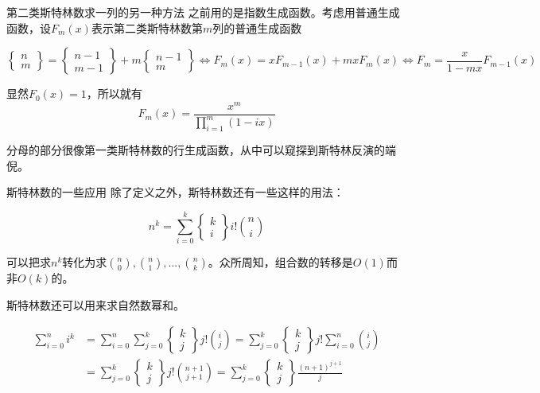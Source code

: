 \documentclass{beamer}
\begin{document}
	\begin{frame}{第二类斯特林数求一列的另一种方法}
		之前用的是指数生成函数。考虑用普通生成函数，设$F_m(x)$表示第二类斯特林数第$m$列的普通生成函数
		
		$$\begin{Bmatrix}n\\m\end{Bmatrix}=\begin{Bmatrix}n-1\\m-1\end{Bmatrix}+m\begin{Bmatrix}n-1\\m\end{Bmatrix} \Leftrightarrow F_m(x)=xF_{m-1}(x)+mxF_m(x)\Leftrightarrow F_m=\frac{x}{1-mx}F_{m-1}(x)$$
		
		显然$F_0(x)=1$，所以就有$$F_m(x)=\frac{x^m}{\prod_{i=1}^m(1-ix)}$$
		
		分母的部分很像第一类斯特林数的行生成函数，从中可以窥探到斯特林反演的端倪。
	\end{frame}
	\begin{frame}{斯特林数的一些应用}
		除了定义之外，斯特林数还有一些这样的用法：
		
		$$n^k=\sum_{i=0}^k\begin{Bmatrix}k\\i\end{Bmatrix}i!\binom{n}{i}$$
		
		可以把求$n^k$转化为求$\binom{n}{0},\binom{n}{1},...,\binom{n}{k}$。众所周知，组合数的转移是$O(1)$而非$O(k)$的。
		
		斯特林数还可以用来求自然数幂和。
		
		$$
		\begin{aligned}
		\sum_{i=0}^ni^k
		&=\sum_{i=0}^n\sum_{j=0}^k\begin{Bmatrix}k\\j\end{Bmatrix}j!\binom{i}{j}=\sum_{j=0}^k\begin{Bmatrix}k\\j\end{Bmatrix}j!\sum_{i=0}^n\binom{i}{j}\\
		&=\sum_{j=0}^k\begin{Bmatrix}k\\j\end{Bmatrix}j!\binom{n+1}{j+1}=\sum_{j=0}^k\begin{Bmatrix}k\\j\end{Bmatrix}\frac{(n+1)^{\underline{j+1}}}{j}
		\end{aligned}
		$$
	\end{frame}
\end{document}

